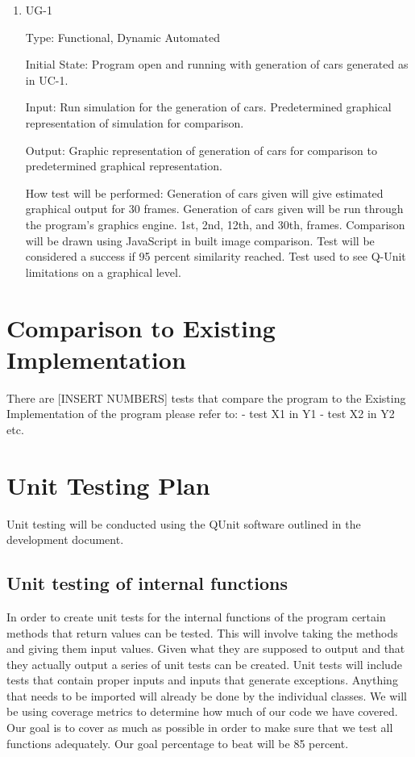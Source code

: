 \documentclass[12pt, titlepage]{article}
\begin{document}
\begin{enumerate}

\item{UG-1\\}

Type: Functional, Dynamic Automated
					
Initial State: Program open and running with generation of cars generated as in UC-1.
					
Input: Run simulation for the generation of cars. Predetermined graphical representation of simulation for comparison.
					
Output: Graphic representation of generation of cars for comparison to predetermined graphical representation.
					
How test will be performed: Generation of cars given will give estimated graphical output for 30 frames. Generation of cars given will be run through the program's graphics engine. 1st, 2nd, 12th, and 30th, frames. Comparison will be drawn using JavaScript in built image comparison. Test will be considered a success if 95 percent similarity reached. Test used to see Q-Unit limitations on a graphical level.

\end{enumerate}
	
\section{Comparison to Existing Implementation}	

There are [INSERT NUMBERS] tests that compare the program to the Existing Implementation of the program please refer to:
- test X1 in Y1
- test X2 in Y2
etc.
				
\section{Unit Testing Plan}

Unit testing will be conducted using the QUnit software outlined in the development document.
		
\subsection{Unit testing of internal functions}

In order to create unit tests for the internal functions of the program certain methods that return values
can be tested. This will involve taking the methods and giving them input values. Given what they are
supposed to output and that they actually output a series of unit tests can be created. Unit tests will include
tests that contain proper inputs and inputs that generate exceptions.  Anything that needs to be imported will already be done
by the individual classes. We will be using coverage metrics to determine how much of our code we have
covered. Our goal is to cover as much as possible in order to make sure that we test all functions adequately.
Our goal percentage to beat will be 85 percent.
		
\end{document}
